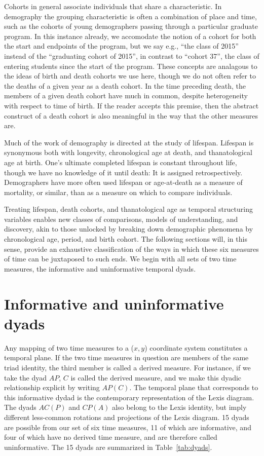 \documentclass[11pt,oneside,a4paper]{article} %
\begin{document}
Cohorts in general associate individuals that share a characteristic. In
demography the grouping characteristic is often a combination of place and time, such as
the cohorts of young demographers passing through a particular graduate program.
In this instance already, we accomodate the notion of a cohort for both the
start and endpoints of the program, but we say e.g., ``the class of 2015''
instead of the ``graduating cohort of 2015'', in contrast to ``cohort 37'', the
 class of entering students since the start of the program.
These concepts are analagous to the ideas of birth and death cohorts we use here, though we do not often refer to the
deaths of a given year as a death cohort. In the time preceding
death, the members of a given death cohort have much in common, despite
heterogeneity with respect to time of birth. If the reader accepts this premise,
then the abstract construct of a death cohort is also meaningful in
the way that the other measures are.

Much of the work of demography is directed at the study of lifespan. Lifespan is
synonymous both with longevity, chronological age at death, and thanatological
age at birth. One's ultimate completed lifespan is constant throughout life,
though we have no knowledge of it until death: It is assigned retrospectively.
Demographers have more often used lifespan or age-at-death as a measure of mortality, or similar, than as a measure on which to compare individuals. 

Treating lifespan,
death cohorts, and thanatological age as temporal structuring variables
enables new classes of comparisons, models of understanding, and discovery,
akin to those unlocked by breaking down demographic phenomena by chronological age,
period, and birth cohort. The following sections will, in this sense, provide an
exhaustive classification of the ways in which these six measures of time can be juxtaposed to such ends.
We begin with all sets of two time measures, the informative and uninformative
temporal dyads.

\FloatBarrier

\section*{Informative and uninformative dyads}

Any mapping of two time measures to a ($x,y$) coordinate
system constitutes a temporal plane. If the two time measures in question are
members of the same triad identity, the third member is called a derived
measure. For instance, if we take the dyad $AP$, $C$ is called the derived
measure, and we make this dyadic relationship explicit by writing $AP(C)$.
The temporal plane that corresponds to this informative dydad is the contemporary representation of the
Lexis diagram. The dyads $AC(P)$ and $CP(A)$ also belong to the Lexis identity, but imply different less-common rotations and projections of the Lexis
diagram. 15 dyads are possible from our set of six time measures, 11 of
which are informative, and four of which have no derived time measure, and are
therefore called uninformative. The 15 dyads are summarized in
Table~\ref{tab:dyads}.
\end{document}
